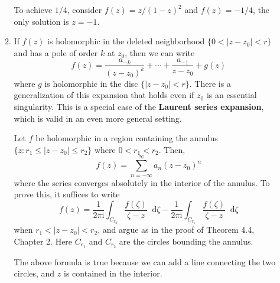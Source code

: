 \documentclass[11pt]{report}
\theoremstyle{mythm}
\let\oldendproof\endproof
\renewenvironment{proof}[1][\proofname]{%
  \oldproof[\normalfont \bfseries #1]%
}{\oldendproof}
\renewcommand*{\proofname}{Proof}
\theoremstyle{myans}
\newcommand{\mi}{\mathrm{i}}
\newcommand{\dd}{\mathop{}\!\mathrm{d}}
\begin{document}
\begin{enumerate}
\begin{enumerate}
\begin{proof}
      To achieve $1/4$, consider $f(z) = z/(1-z)^2$ and $f(z) = -1/4$, the only solution is $z=-1$.
    \end{proof}
    \setcounter{enumi}{2}
    \item If $f(z)$ is holomorphic in the deleted neighborhood $\{0 < |z - z_0| < r\}$ and has
    a pole of order $k$ at $z_0$, then we can write
    \[ f(z) = \frac{a_{-k}}{(z-z_0)^k} + \cdots + \frac{a_{-1}}{z-z_0} + g(z) \]
    where $g$ is holomorphic in the disc $\{|z - z_0| < r\}$. There is a generalization of this
    expansion that holds even if $z_0$ is an essential singularity. This is a special case of
    the \textbf{Laurent series expansion}, which is valid in an even more general setting.

    Let $f$ be holomorphic in a region containing the annulus $\{z : r_1 \leq |z - z_0| \leq r_2\}$
    where $0 < r_1 < r_2$. Then,
    \[ f(z) = \sum_{n=-\infty}^{\infty} a_n (z-z_0)^n \]
    where the series converges absolutely in the interior of the annulus. To prove this,
    it suffices to write
    \[ f(z) = \frac 1{2\pi \mi} \int_{C_{r_2}} \frac{f(\zeta)}{\zeta-z}\dd \zeta
    - \frac 1{2\pi \mi}\int_{C_{r_1}} \frac{f(\zeta)}{\zeta-z}\dd \zeta \]
    when $r_1 < |z - z_0| < r_2$, and argue as in the proof of Theorem 4.4, Chapter 2.
    Here $C_{r_1}$ and $C_{r_2}$ are the circles bounding the annulus.
    \begin{proof}
      The above formula is true because we can add a line connecting the two circles,
      and $z$ is contained in the interior.


\end{proof}
\end{enumerate}
\end{enumerate}
\end{document}
